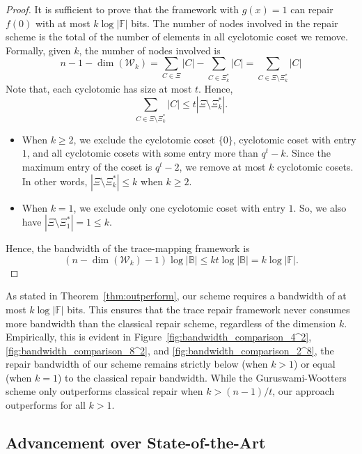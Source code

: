 \documentclass[onecolumn]{IEEEtran}
\theoremstyle{plain}
\theoremstyle{definition}
\newcommand{\FF}{\mathbb{F}}
\newcommand{\BB}{\mathbb{B}}
\newcommand{\cW}{\mathcal{W}}
\begin{document}
\begin{proof}
        It is sufficient to prove that the framework with $g(x) = 1$ can repair $f(0)$ with at most $k\log|\FF|$ bits. The number of nodes involved in the repair scheme is the total of the number of elements in all cyclotomic coset we remove. Formally, given $k$, the number of nodes involved is
        $$
        n-1-\dim(\cW_k) = \sum_{C\in\Xi}|C| - \sum_{C\in\Xi_{k}^*}|C| = \sum_{C\in\Xi\setminus\Xi_k^*}|C|
        $$
        Note that, each cyclotomic has size at most $t$. Hence,
        $$
        \sum_{C\in\Xi\setminus\Xi_k^*}|C| \le t |\Xi\setminus\Xi_k^*|.
        $$
        \begin{itemize}[leftmargin=*]
        \item When $k\ge 2$, we exclude the cyclotomic coset $\{0\}$, cyclotomic coset with entry $1$, and all cyclotomic cosets with some entry more than $q^t-k$. Since the maximum entry of the coset is $q^t-2$, we remove at most $k$ cyclotomic cosets. In other words, $|\Xi\setminus\Xi_k^*|\le k$ when $k\ge 2$.
        \item When $k=1$, we exclude only one cyclotomic coset with entry $1$.
        So, we also have $|\Xi\setminus\Xi_1^*| = 1 \le k$.
        \end{itemize}
        Hence, the bandwidth of the trace-mapping framework is
        $$
        \left(n-\dim(\cW_k) - 1\right)\log|\BB|\le kt \log|\BB| = k\log|\FF|.
        $$
\end{proof}
As stated in Theorem~\ref{thm:outperform}, our scheme requires a bandwidth of at most $k \log |\FF|$ bits. This ensures that the trace repair framework never consumes more bandwidth than the classical repair scheme, regardless of the dimension $k$. Empirically, this is evident in Figure~\ref{fig:bandwidth_comparison_4^2}, \ref{fig:bandwidth_comparison_8^2}, and \ref{fig:bandwidth_comparison_2^8}, the repair bandwidth of our scheme remains strictly below (when $k>1$) or equal (when $k=1$) to the classical repair bandwidth. While the Guruswami-Wootters scheme \cite{guruswamiwooters2017} only outperforms classical repair when $k > (n-1)/t$, our approach outperforms for all $k>1$.

\subsection{Advancement over State-of-the-Art}
\end{document}
